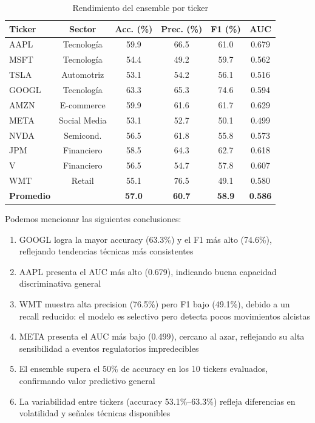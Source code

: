   \begin{table}[H]
  \centering
  \caption{Rendimiento del ensemble por ticker}
  \label{tab:analisis-ticker}
  \small
  \begin{tabular}{lccccc}
  \toprule
  \textbf{Ticker} & \textbf{Sector} & \textbf{Acc. (\%)} & \textbf{Prec. (\%)} & \textbf{F1   
  (\%)} & \textbf{AUC} \\
  \midrule
  AAPL  & Tecnología   & 59.9 & 66.5 & 61.0 & 0.679 \\
  MSFT  & Tecnología   & 54.4 & 49.2 & 59.7 & 0.562 \\
  TSLA  & Automotriz   & 53.1 & 54.2 & 56.1 & 0.516 \\
  GOOGL & Tecnología   & 63.3 & 65.3 & 74.6 & 0.594 \\
  AMZN  & E-commerce   & 59.9 & 61.6 & 61.7 & 0.629 \\
  META  & Social Media & 53.1 & 52.7 & 50.1 & 0.499 \\
  NVDA  & Semicond.    & 56.5 & 61.8 & 55.8 & 0.573 \\
  JPM   & Financiero   & 58.5 & 64.3 & 62.7 & 0.618 \\
  V     & Financiero   & 56.5 & 54.7 & 57.8 & 0.607 \\
  WMT   & Retail       & 55.1 & 76.5 & 49.1 & 0.580 \\
  \midrule
  \textbf{Promedio} & & \textbf{57.0} & \textbf{60.7} & \textbf{58.9} & \textbf{0.586} \\     
  \bottomrule
  \end{tabular}
  \end{table}

Podemos mencionar las siguientes conclusiones:
  \begin{enumerate}
      \item GOOGL logra la mayor accuracy (63.3\%) y el F1 más alto (74.6\%), reflejando tendencias técnicas más consistentes
      \item AAPL presenta el AUC más alto (0.679), indicando buena capacidad discriminativa general
      \item WMT muestra alta precision (76.5\%) pero F1 bajo (49.1\%), debido a un recall reducido: el modelo es selectivo pero detecta pocos movimientos alcistas
      \item META presenta el AUC más bajo (0.499), cercano al azar, reflejando su alta sensibilidad a eventos regulatorios impredecibles
      \item El ensemble supera el 50\% de accuracy en los 10 tickers evaluados, confirmando valor predictivo general
      \item La variabilidad entre tickers (accuracy 53.1\%--63.3\%) refleja diferencias en volatilidad y señales técnicas disponibles
  \end{enumerate}





